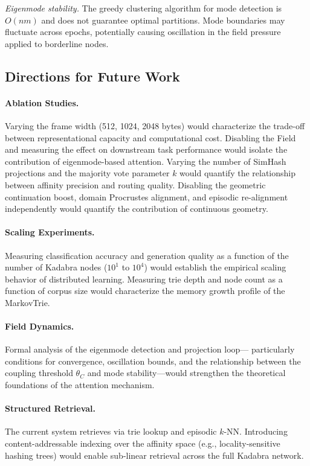 \emph{Eigenmode stability.}  The greedy clustering algorithm for mode
detection is $O(nm)$ and does not guarantee optimal partitions.  Mode
boundaries may fluctuate across epochs, potentially causing oscillation
in the field pressure applied to borderline nodes.

\subsection{Directions for Future Work}
\label{sec:future_work}

\paragraph{Ablation Studies.}
Varying the frame width (512, 1024, 2048 bytes) would characterize the
trade-off between representational capacity and computational cost.
Disabling the Field and measuring the effect on downstream task
performance would isolate the contribution of eigenmode-based attention.
Varying the number of SimHash projections and the majority vote
parameter $k$ would quantify the relationship between affinity precision
and routing quality.  Disabling the geometric continuation boost,
domain Procrustes alignment, and episodic re-alignment independently
would quantify the contribution of continuous geometry.

\paragraph{Scaling Experiments.}
Measuring classification accuracy and generation quality as a function
of the number of Kadabra nodes ($10^1$ to $10^4$) would establish the
empirical scaling behavior of distributed learning.  Measuring trie
depth and node count as a function of corpus size would characterize the
memory growth profile of the MarkovTrie.

\paragraph{Field Dynamics.}
Formal analysis of the eigenmode detection and projection loop---
particularly conditions for convergence, oscillation bounds, and the
relationship between the coupling threshold $\theta_C$ and mode
stability---would strengthen the theoretical foundations of the
attention mechanism.

\paragraph{Structured Retrieval.}
The current system retrieves via trie lookup and episodic $k$-NN.
Introducing content-addressable indexing over the affinity space (e.g.,
locality-sensitive hashing trees) would enable sub-linear retrieval
across the full Kadabra network.

